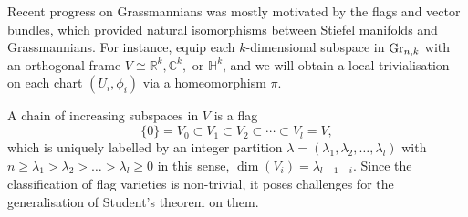 \documentclass{amsart}
\theoremstyle{definition}
\numberwithin{equation}{section}
\begin{document}
Recent progress on Grassmannians was mostly motivated by the flags and vector bundles, which provided natural isomorphisms between Stiefel manifolds and Grassmannians. For instance, equip each $k$-dimensional subspace in ${\rm Gr}_{n,k}$ with an orthogonal frame $V \cong \mathbb{R}^k, \mathbb{C}^k,$ or $\mathbb{H}^k$, and we will obtain a local trivialisation on each chart $(U_i,\phi_i)$ via a homeomorphism $\pi$. 
\begin{figure}[htbp]
    \centering
     \quad {}
    \label{fig:tikzcd1}
\end{figure}
A chain of increasing subspaces in $V$ is a flag
\[\{0\}=V_{0}\subset V_{1}\subset V_{2}\subset \cdots \subset V_{l}=V,\]
which is uniquely labelled by an integer partition $\lambda = (\lambda_1,\lambda_2,\dots,\lambda_l)$ with $ n\geq \lambda_1>\lambda_2>\dots>\lambda_{l}\geq0$ in this sense, $\dim (V_{i}) = \lambda_{l+1 - i}$. Since the classification of flag varieties is non-trivial, it poses challenges for the generalisation of Student's theorem on them.
\end{document}
